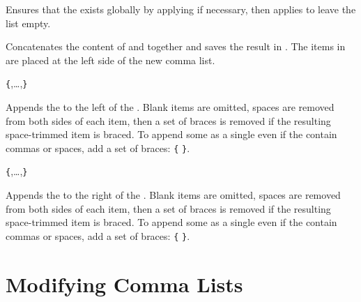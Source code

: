 \documentclass[oneside]{book}
\begin{document}
\begin{function}{\ClistClearNew}
\begin{syntax}
 
\end{syntax}
Ensures that the  exists globally by applying
 if necessary, then applies  to leave
the list empty.
\end{function}

\begin{function}{\ClistConcat}
\begin{syntax}
   
\end{syntax}
Concatenates the content of  and 
together and saves the result in . The items in
 are placed at the left side of the new comma list.
\end{function}

\begin{function}{\ClistPutLeft}
\begin{syntax}
  \verb|{|,\ldots{},\verb|}|
\end{syntax}
Appends the  to the left of the .
Blank items are omitted, spaces are removed from both sides of each
item, then a set of braces is removed if the resulting space-trimmed
item is braced.
To append some  as a single  even if the
 contain commas or spaces, add a set of braces:
  \verb|{|  \verb|}|.
\end{function}
 
\begin{function}{\ClistPutRight}
\begin{syntax}
  \verb|{|,\ldots{},\verb|}|
\end{syntax}
Appends the  to the right of the .
Blank items are omitted, spaces are removed from both sides of each
item, then a set of braces is removed if the resulting space-trimmed
item is braced.
To append some  as a single  even if the
 contain commas or spaces, add a set of braces:
  \verb|{|  \verb|}|.
\end{function}
 
\section{Modifying Comma Lists}
 
\end{document}

